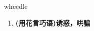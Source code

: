 
\begin{frame}
{\huge wheedle}
\begin{center}
\begin{enumerate}\Large
  \item \textbf{(用花言巧语)诱惑，哄骗}
\end{enumerate}
\end{center}
\end{frame}
